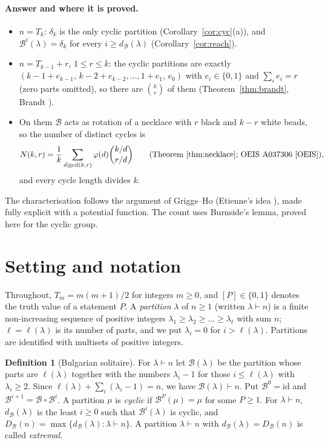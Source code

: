 \documentclass[11pt]{article}
\theoremstyle{definition}
\newtheorem{definition}[theorem]{Definition}
\newcommand{\B}{\mathcal{B}}
\newcommand{\dB}{d_{\mathcal{B}}}
\newcommand{\DB}{D_{\mathcal{B}}}
\renewcommand{\le}{\leqslant}
\renewcommand{\ge}{\geqslant}
\begin{document}
\paragraph{Answer and where it is proved.}
\begin{itemize}
\item $n=T_k$: $\delta_k$ is the only cyclic partition (Corollary~\ref{cor:cyc}(a)), and $\B^i(\lambda)=\delta_k$ for
every $i\ge\dB(\lambda)$ (Corollary~\ref{cor:reach}).
\item $n=T_{k-1}+r$, $1\le r\le k$: the cyclic partitions are exactly
$(k-1+e_{k-1},\,k-2+e_{k-2},\dots,1+e_1,\,e_0)$ with $e_i\in\{0,1\}$ and $\sum_ie_i=r$ (zero parts omitted), so there
are $\binom kr$ of them (Theorem~\ref{thm:brandt}, Brandt \cite{Br}).
\item On them $\B$ acts as rotation of a necklace with $r$ black and $k-r$ white beads, so the number of distinct
cycles is
\[N(k,r)=\frac1k\sum_{d\mid\gcd(k,r)}\varphi(d)\binom{k/d}{r/d}\qquad\text{(Theorem~\ref{thm:necklace}; OEIS A037306 \cite{OEIS})},\]
and every cycle length divides $k$.
\end{itemize}
The characterisation follows the argument of Griggs--Ho \cite[\S2]{GH} (Etienne's idea \cite{Et}), made fully
explicit with a potential function.  The count uses Burnside's lemma, proved here for the cyclic group.

\section{Setting and notation}\label{sec:defs}

Throughout, $T_m=m(m+1)/2$ for integers $m\ge 0$, and $[P]\in\{0,1\}$ denotes the truth value
of a statement $P$.
A \emph{partition} $\lambda$ of $n\ge 1$ (written $\lambda\vdash n$) is a finite non-increasing
sequence of positive integers $\lambda_1\ge\lambda_2\ge\dots\ge\lambda_\ell$ with sum $n$;
$\ell=\ell(\lambda)$ is its number of parts, and we put $\lambda_i=0$ for $i>\ell(\lambda)$.
Partitions are identified with multisets of positive integers.

\begin{definition}[Bulgarian solitaire]
For $\lambda\vdash n$ let $\B(\lambda)$ be the partition whose parts are $\ell(\lambda)$ together
with the numbers $\lambda_i-1$ for those $i\le\ell(\lambda)$ with $\lambda_i\ge 2$.
Since $\ell(\lambda)+\sum_{i}(\lambda_i-1)=n$, we have $\B(\lambda)\vdash n$.
Put $\B^0=\mathrm{id}$ and $\B^{i+1}=\B\circ\B^{i}$.
A partition $\mu$ is \emph{cyclic} if $\B^P(\mu)=\mu$ for some $P\ge 1$.
For $\lambda\vdash n$, $\dB(\lambda)$ is the least $i\ge 0$ such that $\B^i(\lambda)$ is cyclic,
and $\DB(n)=\max\{\dB(\lambda):\lambda\vdash n\}$.
A partition $\lambda\vdash n$ with $\dB(\lambda)=\DB(n)$ is called \emph{extremal}.
\end{definition}
\end{document}
